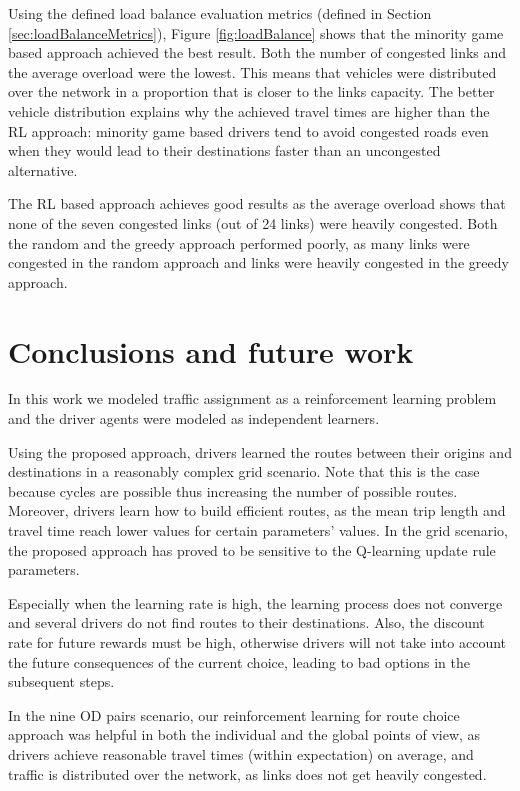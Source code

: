 \documentclass{RITA}
\begin{document}
Using the defined load balance evaluation metrics (defined in Section \ref{sec:loadBalanceMetrics}), Figure \ref{fig:loadBalance} shows that the minority game based approach achieved the best result. Both the number of congested links and the average overload were the lowest. This means that vehicles were distributed over the network in a proportion that is closer to the links capacity. The better vehicle distribution explains why the achieved travel times are higher than the RL approach: minority game based drivers tend to avoid congested roads even when they would lead to their destinations faster than an uncongested alternative. 

The RL based approach achieves good results as the average overload shows that none of the seven congested links (out of 24 links) were heavily congested. Both the random and the greedy approach performed poorly, as many links were congested in the random approach and links were heavily congested in the greedy approach.

\section{Conclusions and future work}
\label{sec:conclusions}

In this work we modeled traffic assignment as a reinforcement learning problem and the driver agents were modeled as independent learners.

Using the proposed approach, drivers learned the routes between their origins and destinations in a reasonably complex grid scenario. Note that this is the case because cycles are possible thus increasing the number of possible routes. Moreover, drivers learn how to build efficient routes, as the mean trip length and travel time reach lower values for certain parameters' values. In the grid scenario, the proposed approach has proved to be sensitive to the Q-learning update rule parameters. 

Especially when the learning rate is high, the learning process does not converge and several drivers do not find routes to their destinations. Also, the discount rate for future rewards must be high, otherwise drivers will not take into account the future consequences of the current choice, leading to bad options in the subsequent steps.

In the nine OD pairs scenario, our reinforcement learning for route choice approach was helpful in both the individual and the global points of view, as drivers achieve reasonable travel times (within expectation) on average, and traffic is distributed over the network, as links does not get heavily congested.
\end{document}
